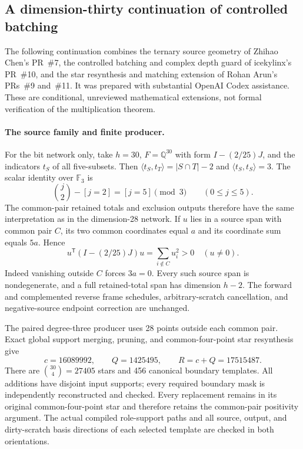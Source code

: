 \subsection{A dimension-thirty continuation of controlled batching}
\label{sec:dimension30-batching}

The following continuation combines the ternary source geometry of
Zhihao Chen's PR~\#7, the controlled batching and complex depth guard of
icekylinx's PR~\#10, and the star resynthesis and matching extension of
Rohan Arun's PRs~\#9 and~\#11. It was prepared with substantial OpenAI
Codex assistance. These are conditional, unreviewed mathematical
extensions, not formal verification of the multiplication theorem.

\paragraph{The source family and finite producer.}
For the bit network only, take $h=30$, $F=\mathbb Q^{30}$ with form
$I-(2/25)J$, and the indicators $t_S$ of all five-subsets. Then
$\langle t_S,t_T\rangle=|S\cap T|-2$ and
$\langle t_S,t_S\rangle=3$. The scalar identity over $\mathbb F_3$ is
\[
 \binom j2-[j=2]=[j=5]\pmod3\qquad(0\le j\le5).
\]
The common-pair retained totals and exclusion outputs therefore have
the same interpretation as in the dimension-28 network. If $u$ lies
in a source span with common pair $C$, its two common coordinates equal
$a$ and its coordinate sum equals $5a$. Hence
\[
 u^{\mathsf T}(I-(2/25)J)u=\sum_{i\notin C}u_i^2>0\quad(u\ne0).
\]
Indeed vanishing outside $C$ forces $3a=0$. Every such source span is
nondegenerate, and a full retained-total span has dimension $h-2$.
The forward and complemented reverse frame schedules, arbitrary-scratch
cancellation, and negative-source endpoint correction are unchanged.

The paired degree-three producer uses 28 points outside each common
pair. Exact global support merging, pruning, and common-four-point
star resynthesis give
\[
 c=16089992,\qquad Q=1425495,\qquad R=c+Q=17515487.
\]
There are $\binom{30}{4}=27405$ stars and 456 canonical boundary templates.
All additions have disjoint input supports; every required boundary
mask is independently reconstructed and checked. Every replacement
remains in its original common-four-point star and therefore retains
the common-pair positivity argument. The actual compiled role-support
paths and all source, output, and dirty-scratch basis directions of
each selected template are checked in both orientations.

